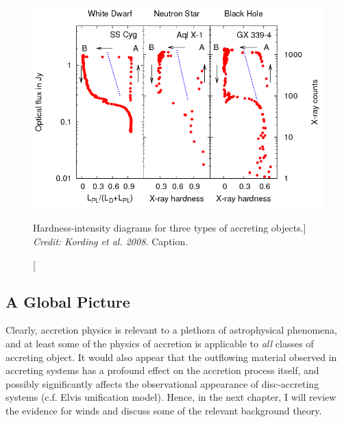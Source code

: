 \begin{figure}
\centering
\includegraphics[width=1.0\textwidth]{figures/01-intro/kording_hid.png}
\caption
[Hardness-intensity diagrams for three types of accreting objects.]
{
{\sl Credit: Kording et al. 2008.} 
Caption.
} 
\label{fig:kording_hid}
\end{figure}

\subsection{A Global Picture}

Clearly, accretion physics is relevant to a plethora of astrophysical phenomena, 
and at least some of the physics of accretion is applicable to {\em all} 
classes of accreting object. 
It would also appear that the outflowing material observed in accreting systems 
has a profound effect on the accretion process itself, and 
possibly significantly affects the observational 
appearance of disc-accreting systems (c.f. Elvis unification model). 
Hence, in the next chapter, I will review the evidence for
winds and discuss some of the relevant background theory.

